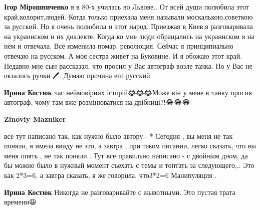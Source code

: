 \begin{itemize}
\begin{itemize}
 
\textbf{Ігор Мірошниченко} я в 80-х училась во Львове.. От всей души полюбила
этот край,колорит,людей. Когда только приехала меня называли
москалькою,советкою за русский. Но я очень полюбила и этот народ. Приезжая в
Киев,я разговаривала на украинском и их диалекте. Когда ко мне люди обращались
на украинском я на нём и отвечала. Всё изменила помар. революция. Сейчас я
принципиально отвечаю на русском. А моя сестра живёт на Буковине. И я обожаю
этот край. Недавно мне сын рассказал, что просил у Вас автограф возле танка. Но
у Вас не окзалось ручки 🖊. Думаю причина его русский.👿


 

\textbf{Ирина Костюк} час неймовірних історій😂😂😂Може він у мене в танку
просив автограф, чому там вже розмінюватися на дрібниці?!😂😂😂

 
\textbf{Zinoviy Mazniker} 

все тут написано так, как нужно было автору.- * Сегодня , вы меня не так поняли,
я имела ввиду не это, а завтра , при таком писании, легко сказать, что вы меня
опять , не так поняли . Тут все правильно написано - с двойным дном, да бы
можно было в нужный момент съехать с темы и топтать за следующего,.. Это как
2*3=6, а завтра сказать, я же говорила, что3*2=6 Манипуляция .


 
\textbf{Ирина Костюк} Никогда не разговаривайте с жывотными. Это пустая трата времени😆


\end{itemize}
\end{itemize}
